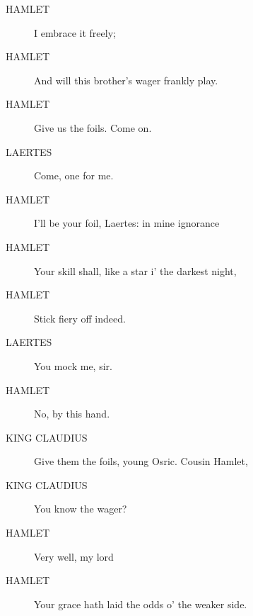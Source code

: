 \documentclass{article}
\begin{document}
\begin{description}
            
\item[HAMLET] I embrace it freely;
\item[HAMLET] And will this brother's wager frankly play.
\item[HAMLET] Give us the foils. Come on.
\end{description}
          
\begin{description}
            
\item[LAERTES] Come, one for me.
\end{description}
          
\begin{description}
            
\item[HAMLET] I'll be your foil, Laertes: in mine ignorance
\item[HAMLET] Your skill shall, like a star i' the darkest night,
\item[HAMLET] Stick fiery off indeed.
\end{description}
          
\begin{description}
            
\item[LAERTES] You mock me, sir.
\end{description}
          
\begin{description}
            
\item[HAMLET] No, by this hand.
\end{description}
          
\begin{description}
            
\item[KING CLAUDIUS] Give them the foils, young Osric. Cousin Hamlet,
\item[KING CLAUDIUS] You know the wager?
\end{description}
          
\begin{description}
            
\item[HAMLET] Very well, my lord
\item[HAMLET] Your grace hath laid the odds o' the weaker side.
\end{description}
          
\end{document}
